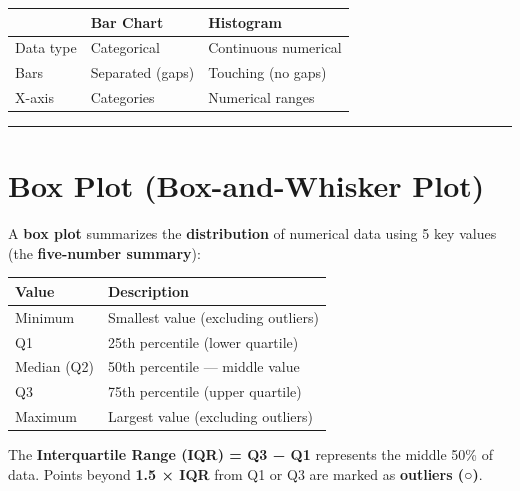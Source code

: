 \documentclass[
  12pt,
  letterpaper,
]{book}
\newcounter{none} %
\begin{document}
\begin{tcolorbox}[enhanced jigsaw, arc=.35mm, bottomrule=.15mm, bottomtitle=1mm, breakable, colback=white, colbacktitle=quarto-callout-tip-color!10!white, colframe=quarto-callout-tip-color-frame, coltitle=black, left=2mm, leftrule=.75mm, opacityback=0, opacitybacktitle=0.6, rightrule=.15mm, title={💡 Bar Chart vs Histogram}, titlerule=0mm, toprule=.15mm, toptitle=1mm]

{\def\LTcaptype{none} %
\begin{longtable}[]{@{}lll@{}}
\toprule\noalign{}
& Bar Chart & Histogram \\
\midrule\noalign{}
\endhead
\bottomrule\noalign{}
\endlastfoot
Data type & Categorical & Continuous numerical \\
Bars & Separated (gaps) & Touching (no gaps) \\
X-axis & Categories & Numerical ranges \\
\end{longtable}
}

\end{tcolorbox}

\begin{center}\rule{0.5\linewidth}{0.5pt}\end{center}

\section{Box Plot (Box-and-Whisker
Plot)}\label{box-plot-box-and-whisker-plot}

A \textbf{box plot} summarizes the \textbf{distribution} of numerical
data using 5 key values (the \textbf{five-number summary}):

{\def\LTcaptype{none} %
\begin{longtable}[]{@{}ll@{}}
\toprule\noalign{}
Value & Description \\
\midrule\noalign{}
\endhead
\bottomrule\noalign{}
\endlastfoot
Minimum & Smallest value (excluding outliers) \\
Q1 & 25th percentile (lower quartile) \\
Median (Q2) & 50th percentile --- middle value \\
Q3 & 75th percentile (upper quartile) \\
Maximum & Largest value (excluding outliers) \\
\end{longtable}
}

The \textbf{Interquartile Range (IQR) = Q3 − Q1} represents the middle
50\% of data. Points beyond \textbf{1.5 × IQR} from Q1 or Q3 are marked
as \textbf{outliers (○)}.
\end{document}
